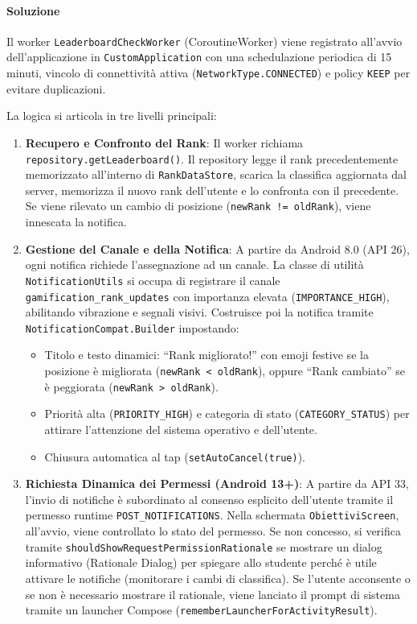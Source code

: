 \documentclass[a4paper,12pt]{report}
\begin{document}
    \paragraph{Soluzione}
    Il worker \texttt{LeaderboardCheckWorker} (CoroutineWorker) viene registrato all'avvio dell'applicazione
    in \texttt{CustomApplication} con una schedulazione periodica di 15 minuti, vincolo di connettività attiva
    (\texttt{NetworkType.CONNECTED}) e policy \texttt{KEEP} per evitare duplicazioni.

    La logica si articola in tre livelli principali:
    \begin{enumerate}
        \item \textbf{Recupero e Confronto del Rank}: Il worker richiama \texttt{repository.getLeaderboard()}.
        Il repository legge il rank precedentemente memorizzato all'interno di \texttt{RankDataStore}, scarica la classifica aggiornata dal server, memorizza il nuovo rank dell'utente e lo confronta con il precedente. Se viene rilevato un cambio di posizione (\texttt{newRank != oldRank}), viene innescata la notifica.

        \item \textbf{Gestione del Canale e della Notifica}: A partire da Android 8.0 (API 26), ogni notifica richiede l'assegnazione ad un canale. La classe di utilità \texttt{NotificationUtils} si occupa di registrare il canale \texttt{gamification\_rank\_updates} con importanza elevata (\texttt{IMPORTANCE\_HIGH}), abilitando vibrazione e segnali visivi. Costruisce poi la notifica tramite \texttt{NotificationCompat.Builder} impostando:
        \begin{itemize}
            \item Titolo e testo dinamici: ``Rank migliorato!'' con emoji festive se la posizione è migliorata (\texttt{newRank < oldRank}), oppure ``Rank cambiato'' se è peggiorata (\texttt{newRank > oldRank}).
            \item Priorità alta (\texttt{PRIORITY\_HIGH}) e categoria di stato (\texttt{CATEGORY\_STATUS}) per attirare l'attenzione del sistema operativo e dell'utente.
            \item Chiusura automatica al tap (\texttt{setAutoCancel(true)}).
        \end{itemize}

        \item \textbf{Richiesta Dinamica dei Permessi (Android 13+)}: A partire da API 33, l'invio di notifiche è subordinato al consenso esplicito dell'utente tramite il permesso runtime \texttt{POST\_NOTIFICATIONS}.
        Nella schermata \texttt{ObiettiviScreen}, all'avvio, viene controllato lo stato del permesso. Se non concesso, si verifica tramite \texttt{shouldShowRequestPermissionRationale} se mostrare un dialog informativo (Rationale Dialog) per spiegare allo studente perché è utile attivare le notifiche (monitorare i cambi di classifica). Se l'utente acconsente o se non è necessario mostrare il rationale, viene lanciato il prompt di sistema tramite un launcher Compose (\texttt{rememberLauncherForActivityResult}).
    \end{enumerate}
\end{document}
